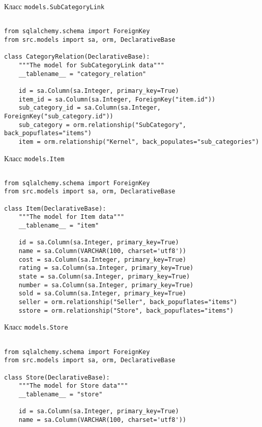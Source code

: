 \begin{center}Класс \texttt{models.SubCategoryLink}\end{center}

\begin{lstlisting}[style=app]

from sqlalchemy.schema import ForeignKey
from src.models import sa, orm, DeclarativeBase

class CategoryRelation(DeclarativeBase):
    """The model for SubCategoryLink data"""
    __tablename__ = "category_relation"

    id = sa.Column(sa.Integer, primary_key=True)
    item_id = sa.Column(sa.Integer, ForeignKey("item.id"))
    sub_category_id = sa.Column(sa.Integer, ForeignKey("sub_category.id"))
    sub_category = orm.relationship("SubCategory", back_popuflates="items")
    item = orm.relationship("Kernel", back_populates="sub_categories")

\end{lstlisting}

\begin{center}Класс \texttt{models.Item}\end{center}

\begin{lstlisting}[style=app]

from sqlalchemy.schema import ForeignKey
from src.models import sa, orm, DeclarativeBase

class Item(DeclarativeBase):
    """The model for Item data"""
    __tablename__ = "item"

    id = sa.Column(sa.Integer, primary_key=True)
    name = sa.Column(VARCHAR(100, charset='utf8'))
    cost = sa.Column(sa.Integer, primary_key=True)
    rating = sa.Column(sa.Integer, primary_key=True)
    state = sa.Column(sa.Integer, primary_key=True)
    number = sa.Column(sa.Integer, primary_key=True)
    sold = sa.Column(sa.Integer, primary_key=True)
    seller = orm.relationship("Seller", back_popuflates="items")
    sstore = orm.relationship("Store", back_popuflates="items")

\end{lstlisting}

\begin{center}Класс \texttt{models.Store}\end{center}

\begin{lstlisting}[style=app]

from sqlalchemy.schema import ForeignKey
from src.models import sa, orm, DeclarativeBase

class Store(DeclarativeBase):
    """The model for Store data"""
    __tablename__ = "store"

    id = sa.Column(sa.Integer, primary_key=True)
    name = sa.Column(VARCHAR(100, charset='utf8'))

\end{lstlisting}

